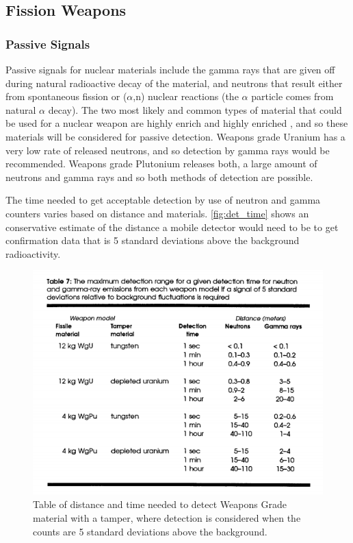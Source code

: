 \documentclass{report}
\begin{document}
\subsection{Fission Weapons}
 
   \subsubsection{Passive Signals}

Passive signals for nuclear materials include the gamma rays that are given off during natural radioactive decay of the material, and neutrons that result either from spontaneous fission or (\(\alpha\),n) nuclear reactions (the \(\alpha\) particle comes from natural \(\alpha\) decay). The two most likely and common types of material that could be used for a nuclear weapon are highly enrich  and highly enriched , and so these materials will be considered for passive detection. Weapons grade Uranium has a very low rate of released neutrons, and so detection by gamma rays would be recommended. Weapons grade Plutonium releases both, a large amount of neutrons and gamma rays and so both methods of detection are possible. 

The time needed to get acceptable detection by use of neutron and gamma counters varies based on distance and materials. \autoref{fig:det_time} shows an conservative estimate of the distance a mobile detector would need to be to get confirmation data that is 5 standard deviations above the background radioactivity. 


\begin{figure}[h]
 \centering
 \includegraphics[trim = 0cm 0cm 0cm 2cm, clip,scale=0.6]{./figures/det_time.png}
   \caption{Table of distance and time needed to detect Weapons Grade  material with a tamper, where detection is considered when the counts are 5 standard deviations above the background. \cite{Fetter1990}}
     \label{fig:det_time}
\end{figure}
\end{document}
